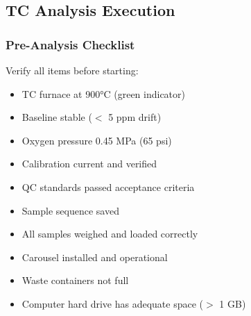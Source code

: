 \documentclass[11pt,a4paper]{article}\usepackage[]{graphicx}\usepackage[]{xcolor}
\begin{document}
\subsection{TC Analysis Execution}

\subsubsection{Pre-Analysis Checklist}
Verify all items before starting:
\begin{itemize}[noitemsep]
    \item[$\Box$] TC furnace at 900°C (green indicator)
    \item[$\Box$] Baseline stable ($<$ 5 ppm drift)
    \item[$\Box$] Oxygen pressure 0.45 MPa (65 psi)
    \item[$\Box$] Calibration current and verified
    \item[$\Box$] QC standards passed acceptance criteria
    \item[$\Box$] Sample sequence saved
    \item[$\Box$] All samples weighed and loaded correctly
    \item[$\Box$] Carousel installed and operational
    \item[$\Box$] Waste containers not full
    \item[$\Box$] Computer hard drive has adequate space ($>$ 1 GB)
\end{itemize}
\end{document}
